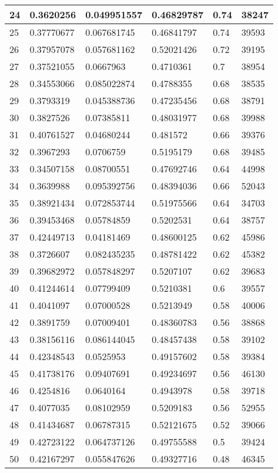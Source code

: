 \begin{longtable}{|l|l|l|l|l|l|}
24 & 0.3620256 & 0.049951557 & 0.46829787 & 0.74 & 38247 \\ \hline 
25 & 0.37770677 & 0.067681745 & 0.46841797 & 0.74 & 39593 \\ \hline 
26 & 0.37957078 & 0.057681162 & 0.52021426 & 0.72 & 39195 \\ \hline 
27 & 0.37521055 & 0.0667963 & 0.4710361 & 0.7 & 38954 \\ \hline 
28 & 0.34553066 & 0.085022874 & 0.4788355 & 0.68 & 38535 \\ \hline 
29 & 0.3793319 & 0.045388736 & 0.47235456 & 0.68 & 38791 \\ \hline 
30 & 0.3827526 & 0.07385811 & 0.48031977 & 0.68 & 39988 \\ \hline 
31 & 0.40761527 & 0.04680244 & 0.481572 & 0.66 & 39376 \\ \hline 
32 & 0.3967293 & 0.0706759 & 0.5195179 & 0.68 & 39485 \\ \hline 
33 & 0.34507158 & 0.08700551 & 0.47692746 & 0.64 & 44998 \\ \hline 
34 & 0.3639988 & 0.095392756 & 0.48394036 & 0.66 & 52043 \\ \hline 
35 & 0.38921434 & 0.072853744 & 0.51975566 & 0.64 & 34703 \\ \hline 
36 & 0.39453468 & 0.05784859 & 0.5202531 & 0.64 & 38757 \\ \hline 
37 & 0.42449713 & 0.04181469 & 0.48600125 & 0.62 & 45986 \\ \hline 
38 & 0.3726607 & 0.082435235 & 0.48781422 & 0.62 & 45382 \\ \hline 
39 & 0.39682972 & 0.057848297 & 0.5207107 & 0.62 & 39683 \\ \hline 
40 & 0.41244614 & 0.07799409 & 0.5210381 & 0.6 & 39557 \\ \hline 
41 & 0.4041097 & 0.07000528 & 0.5213949 & 0.58 & 40006 \\ \hline 
42 & 0.3891759 & 0.07009401 & 0.48360783 & 0.56 & 38868 \\ \hline 
43 & 0.38156116 & 0.086144045 & 0.48457438 & 0.58 & 39102 \\ \hline 
44 & 0.42348543 & 0.0525953 & 0.49157602 & 0.58 & 39384 \\ \hline 
45 & 0.41738176 & 0.09407691 & 0.49234697 & 0.56 & 46130 \\ \hline 
46 & 0.4254816 & 0.0640164 & 0.4943978 & 0.58 & 39718 \\ \hline 
47 & 0.4077035 & 0.08102959 & 0.5209183 & 0.56 & 52955 \\ \hline 
48 & 0.41434687 & 0.06787315 & 0.52121675 & 0.52 & 39066 \\ \hline 
49 & 0.42723122 & 0.064737126 & 0.49755588 & 0.5 & 39424 \\ \hline 
50 & 0.42167297 & 0.055847626 & 0.49327716 & 0.48 & 46345 \\ \hline 
\end{longtable}